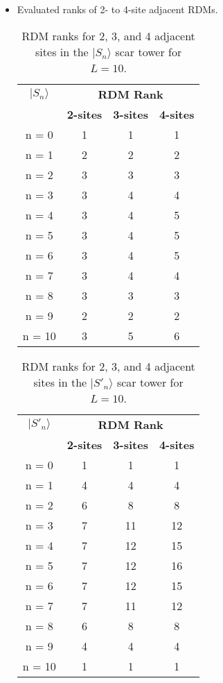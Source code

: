 \documentclass[11pt]{article}
\begin{document}
\begin{itemize}
\begin{itemize}
        \item Evaluated ranks of 2- to 4-site adjacent RDMs.
         \begin{table}[h]
	\centering
	\begin{tabular}{|c|ccc|}
	\hline
	\textbf{$|S_n\rangle$} & \multicolumn{3}{c|}{\textbf{RDM Rank}} \\
	\cline{2-4}
	& \textbf{2-sites} & \textbf{3-sites} & \textbf{4-sites} \\
	\hline
	 n = 0 & 1 & 1 & 1 \\
	 n = 1 & 2 & 2 & 2 \\
	 n = 2 & 3 & 3 & 3 \\
	 n = 3 & 3 & 4 & 4 \\
	 n = 4 & 3 & 4 & 5 \\  
	 n = 5 & 3 & 4 & 5 \\
	 n = 6 & 3 & 4 & 5 \\
	 n = 7 & 3 & 4 & 4 \\
	 n = 8 & 3 & 3 & 3 \\
	 n = 9 & 2 & 2 & 2 \\
	 n = 10 & 3 & 5 & 6 \\
	\hline
	\end{tabular}
	\caption{RDM ranks for 2, 3, and 4 adjacent sites in the $|S_n\rangle$ scar tower for $L=10$.}
	\label{tab:ranks21}
	\end{table}

	 \begin{table}[ht]
	\centering
	\begin{tabular}{|c|ccc|}
	\hline
	\textbf{$|S'_n\rangle$} & \multicolumn{3}{c|}{\textbf{RDM Rank}} \\
	\cline{2-4}
	& \textbf{2-sites} & \textbf{3-sites} & \textbf{4-sites} \\
	\hline
          n = 0 & 1 & 1 & 1 \\
	 n = 1 & 4 & 4 & 4 \\
	 n = 2 & 6 & 8 & 8 \\
	 n = 3 & 7 & 11 & 12 \\
	 n = 4 & 7 & 12 & 15 \\  
	 n = 5 & 7 & 12 & 16 \\
	 n = 6 & 7 & 12 & 15 \\
	 n = 7 & 7 & 11 & 12 \\
	 n = 8 & 6 & 8 & 8 \\
	 n = 9 & 4 & 4 & 4 \\
	 n = 10 & 1 & 1 & 1 \\
	\hline
	\end{tabular}
	\caption{RDM ranks for 2, 3, and 4 adjacent sites in the $|S'_n\rangle$ scar tower for $L=10$.}
	\label{tab:ranks22}
	\end{table}

    \end{itemize}
\end{itemize}
\end{document}
